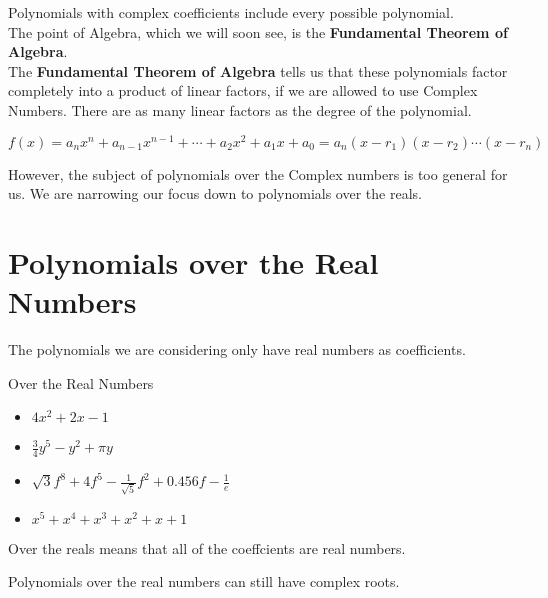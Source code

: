 \documentclass{ximera}
\begin{document}
Polynomials with complex coefficients include every possible polynomial.  \\



The point of Algebra, which we will soon see, is the \textbf{Fundamental Theorem of Algebra}. \\



The \textbf{Fundamental Theorem of Algebra} tells us that these polynomials factor completely into a product of linear factors, if we are allowed to use Complex Numbers. There are as many linear factors as the degree of the polynomial.



\[   f(x) = a_n x^n + a_{n-1} x^{n-1} + \cdots + a_2 x^2 + a_1 x + a_0   =   a_n (x - r_1) (x - r_2) \cdots (x - r_n)  \]


However, the subject of polynomials over the Complex numbers is too general for us.  We are narrowing our focus down to polynomials over the reals.




\section*{Polynomials over the Real Numbers}


The polynomials we are considering only have real numbers as coefficients.


\begin{example} Over the Real Numbers



\begin{itemize}
\item $4 x^2 + 2 x -1$
\item $\frac{3}{4} y^5 - y^2 + \pi y$
\item $\sqrt{3} f^8 + 4 f^5 - \frac{1}{\sqrt{5}} f^2 + 0.456 f - \frac{1}{e}$
\item $x^5 + x^4 + x^3 + x^2 + x + 1$
\end{itemize}



\end{example}






Over the reals means that all of the coeffcients are real numbers.



Polynomials over the real numbers can still have complex roots.
\end{document}
